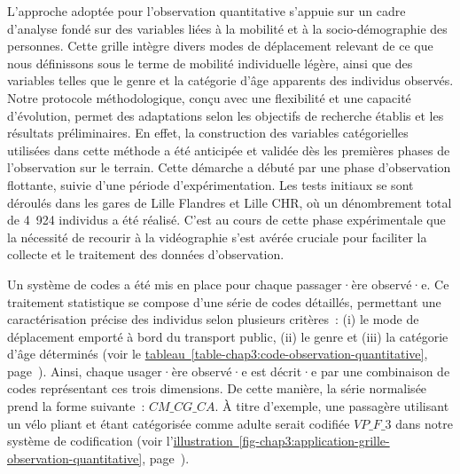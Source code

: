 \begin{refsegment}
L'approche adoptée pour l'observation quantitative s'appuie sur un cadre d'analyse fondé sur des variables liées à la mobilité et à la socio-démographie des personnes. Cette grille intègre divers modes de déplacement relevant de ce que nous définissons sous le terme de mobilité individuelle légère, ainsi que des variables telles que le \gls{genre} et la catégorie d'âge apparents des individus observés. Notre protocole méthodologique, conçu avec une flexibilité et une capacité d'évolution, permet des adaptations selon les objectifs de recherche établis et les résultats préliminaires. En effet, la construction des variables catégorielles utilisées dans cette méthode a été anticipée et validée dès les premières phases de l'observation sur le terrain. Cette démarche a débuté par une phase d'observation flottante, suivie d'une période d'expérimentation. Les tests initiaux se sont déroulés dans les gares de Lille Flandres et Lille CHR, où un dénombrement total de 4~924 individus a été réalisé. C'est au cours de cette phase expérimentale que la nécessité de recourir à la vidéographie s'est avérée cruciale pour faciliter la collecte et le traitement des données d'observation.%

Un système de codes a été mis en place pour chaque passager·ère observé·e. Ce traitement statistique se compose d'une série de codes détaillés, permettant une caractérisation précise des individus selon plusieurs critères~: (i) le mode de déplacement emporté à bord du transport public, (ii) le genre et (iii) la catégorie d'âge déterminés (voir le \hyperref[table-chap3:code-observation-quantitative]{tableau~\ref{table-chap3:code-observation-quantitative}}, page~\pageref{table-chap3:code-observation-quantitative}). Ainsi, chaque usager·ère observé·e est décrit·e par une combinaison de codes représentant ces trois dimensions. De cette manière, la série normalisée prend la forme suivante~: $CM\_CG\_CA$. À titre d'exemple, une passagère utilisant un vélo pliant et étant catégorisée comme adulte serait codifiée $VP\_F\_3$ dans notre système de codification (voir l'\hyperref[fig-chap3:application-grille-observation-quantitative]{illustration~\ref{fig-chap3:application-grille-observation-quantitative}}, page~\pageref{fig-chap3:application-grille-observation-quantitative}).%



\end{refsegment}

